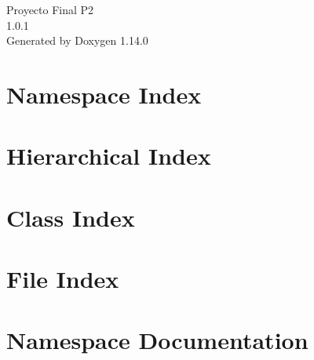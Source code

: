 \documentclass[twoside]{book}
\newcommand{\+}{\discretionary{\mbox{\scriptsize$\hookleftarrow$}}{}{}}
\newcommand{\clearemptydoublepage}{%
    \newpage{\pagestyle{empty}\cleardoublepage}%
  }
\begin{document}
  \raggedbottom
    \hypersetup{pageanchor=false,
                bookmarksnumbered=true,
                pdfencoding=unicode
               }
  \begin{titlepage}
  \vspace*{7cm}
  \begin{center}%
  {\Large Proyecto Final P2}\\
  [1ex]\large 1.\+0.\+1 \\
  \vspace*{1cm}
  {\large Generated by Doxygen 1.14.0}\\
  \end{center}
  \end{titlepage}
  \clearemptydoublepage
  \tableofcontents
  \clearemptydoublepage
  \hypersetup{pageanchor=true}
\chapter{Namespace Index}

\chapter{Hierarchical Index}

\chapter{Class Index}

\chapter{File Index}

\chapter{Namespace Documentation}









\end{document}
